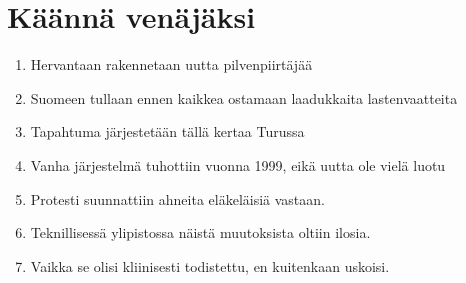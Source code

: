 \documentclass[paper=a4, fontsize=11pt]{scrartcl}
\begin{document}
\section{Käännä venäjäksi}

\begin{enumerate}
    \item Hervantaan rakennetaan uutta pilvenpiirtäjää
    \underline{\hspace{14cm}} \\
    \item Suomeen tullaan ennen kaikkea ostamaan laadukkaita lastenvaatteita
    \underline{\hspace{14cm}} \\
    \item Tapahtuma järjestetään tällä kertaa Turussa
    \underline{\hspace{14cm}} \\
    \item Vanha järjestelmä tuhottiin vuonna 1999, eikä uutta ole vielä luotu
    \underline{\hspace{14cm}} \\
    \item Protesti suunnattiin ahneita eläkeläisiä vastaan.
    \underline{\hspace{14cm}} \\
    \item Teknillisessä ylipistossa näistä muutoksista oltiin ilosia.
    \underline{\hspace{14cm}} \\
    \item Vaikka se olisi kliinisesti todistettu, en kuitenkaan uskoisi. 
    \underline{\hspace{14cm}} 
\end{enumerate}
\end{document}
